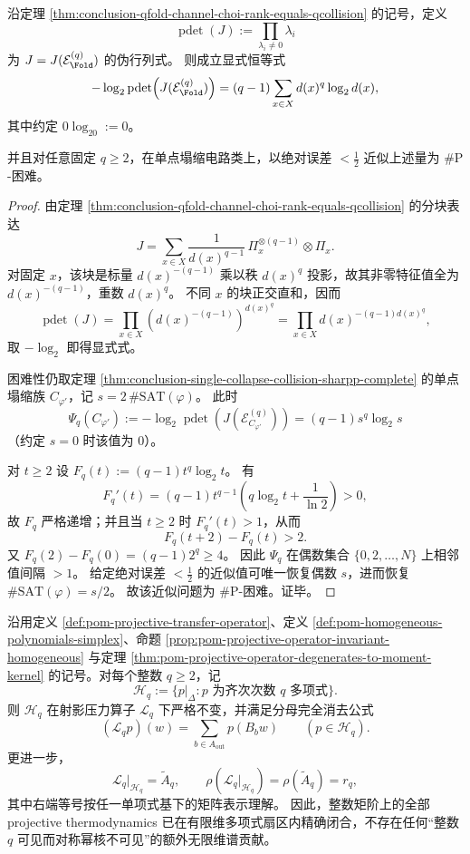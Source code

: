\begin{theorem}\label{thm:conclusion-qfold-choi-pdet-log-sharpp-hard}
沿定理 \ref{thm:conclusion-qfold-channel-choi-rank-equals-qcollision} 的记号，定义
\[
\operatorname{pdet}(J):=\prod_{\lambda_i\neq 0}\lambda_i
\]
为 \(J=J(\mathcal E_{\Fold}^{(q)})\) 的伪行列式。
则成立显式恒等式
\[
-\log_2\operatorname{pdet}\!\left(J(\mathcal E_{\Fold}^{(q)})\right)
=(q-1)\sum_{x\in X} d(x)^q\log_2 d(x),
\]
其中约定 \(0\log_20:=0\)。

并且对任意固定 \(q\ge 2\)，在单点塌缩电路类上，以绝对误差 \(<\frac12\) 近似上述量为 \(\#\mathrm P\)-困难。
\end{theorem}
\begin{proof}
由定理 \ref{thm:conclusion-qfold-channel-choi-rank-equals-qcollision} 的分块表达
\[
J=\sum_{x\in X}\frac{1}{d(x)^{q-1}}\,
\Pi_x^{\otimes(q-1)}\otimes \Pi_x.
\]
对固定 \(x\)，该块是标量 \(d(x)^{-(q-1)}\) 乘以秩 \(d(x)^q\) 投影，故其非零特征值全为 \(d(x)^{-(q-1)}\)，重数 \(d(x)^q\)。
不同 \(x\) 的块正交直和，因而
\[
\operatorname{pdet}(J)
=\prod_{x\in X}\left(d(x)^{-(q-1)}\right)^{d(x)^q}
=\prod_{x\in X} d(x)^{-(q-1)d(x)^q},
\]
取 \(-\log_2\) 即得显式式。

困难性仍取定理 \ref{thm:conclusion-single-collapse-collision-sharpp-complete} 的单点塌缩族 \(C_{\varphi'}\)，记 \(s=2\,\#\mathrm{SAT}(\varphi)\)。
此时
\[
\Psi_q(C_{\varphi'})
:=-\log_2\operatorname{pdet}\!\left(J(\mathcal E_{C_{\varphi'}}^{(q)})\right)
=(q-1)s^q\log_2 s
\]
（约定 \(s=0\) 时该值为 \(0\)）。

对 \(t\ge 2\) 设 \(F_q(t):=(q-1)t^q\log_2 t\)。
有
\[
F_q'(t)
=(q-1)t^{q-1}\!\left(q\log_2 t+\frac{1}{\ln 2}\right)
>0,
\]
故 \(F_q\) 严格递增；并且当 \(t\ge 2\) 时 \(F_q'(t)>1\)，从而
\[
F_q(t+2)-F_q(t)>2.
\]
又 \(F_q(2)-F_q(0)=(q-1)2^q\ge 4\)。
因此 \(\Psi_q\) 在偶数集合 \(\{0,2,\dots,N\}\) 上相邻值间隔 \(>1\)。
给定绝对误差 \(<\frac12\) 的近似值可唯一恢复偶数 \(s\)，进而恢复 \(\#\mathrm{SAT}(\varphi)=s/2\)。
故该近似问题为 \(\#\mathrm P\)-困难。证毕。
\end{proof}

\begin{theorem}[射影压力算子的整数多项式扇区精确闭合]\label{thm:conclusion-projective-pressure-polynomial-sector-exact-closure}
沿用定义 \ref{def:pom-projective-transfer-operator}、定义 \ref{def:pom-homogeneous-polynomials-simplex}、命题 \ref{prop:pom-projective-operator-invariant-homogeneous} 与定理 \ref{thm:pom-projective-operator-degenerates-to-moment-kernel} 的记号。对每个整数 \(q\ge 2\)，记
\[
\mathcal H_q:=\{p\vert_{\Delta}: p \text{ 为齐次次数 } q \text{ 多项式}\}.
\]
则 \(\mathcal H_q\) 在射影压力算子 \(\mathcal L_q\) 下严格不变，并满足分母完全消去公式
\[
(\mathcal L_q p)(w)=\sum_{b\in A_{\mathrm{out}}} p(B_b w)
\qquad (p\in \mathcal H_q).
\]
更进一步，
\[
\mathcal L_q\vert_{\mathcal H_q}=\widetilde A_q,
\qquad
\rho(\mathcal L_q\vert_{\mathcal H_q})=\rho(\widetilde A_q)=r_q,
\]
其中右端等号按任一单项式基下的矩阵表示理解。
因此，整数矩阶上的全部 projective thermodynamics 已在有限维多项式扇区内精确闭合，不存在任何“整数 \(q\) 可见而对称幂核不可见”的额外无限维谱贡献。
\end{theorem}

